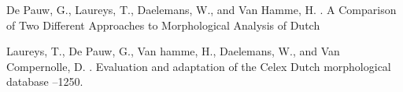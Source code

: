 \documentclass[11pt]{article}
\begin{document}
\begin{thebibliography}{}
De Pauw, G., Laureys, T., Daelemans, W., and Van Hamme, H.
. 
\newblock A Comparison of Two Different Approaches to Morphological Analysis of Dutch

Laureys, T., De Pauw, G., Van hamme, H., Daelemans, W., and Van Compernolle, D.
. 
\newblock Evaluation and adaptation of the Celex Dutch morphological database
--1250.







\end{thebibliography}
\end{document}
